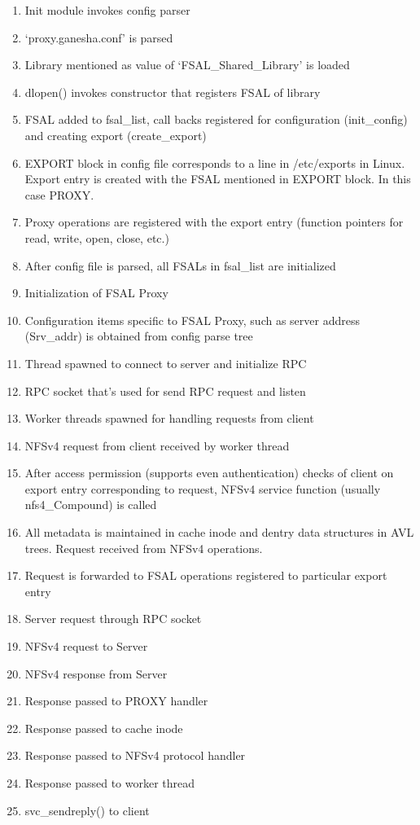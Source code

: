 \documentclass[10pt, journal, twocolumn, twoside]{IEEEtran}
\begin{document}
\begin{enumerate}
\item Init module invokes config parser %
\item `proxy.ganesha.conf' is parsed %
\item Library mentioned as value of `FSAL\_Shared\_Library' is loaded %
\item dlopen() invokes constructor that registers FSAL of library %
\item FSAL added to fsal\_list, call backs registered for configuration (init\_config) and creating export (create\_export) %
\item EXPORT block in config file corresponds to a line in /etc/exports in Linux. Export entry is created with the FSAL
mentioned in EXPORT block. In this case PROXY. %
\item Proxy operations are registered with the export entry (function pointers for read, write, open, close, etc.) %
\item After config file is parsed, all FSALs in fsal\_list are initialized %
\item Initialization of FSAL Proxy %
\item Configuration items specific to FSAL Proxy, such as server address (Srv\_addr) is obtained from config parse tree %
\item Thread spawned to connect to server and initialize RPC %
\item RPC socket that's used for send RPC request and listen %
\item Worker threads spawned for handling requests from client %
\item NFSv4 request from client received by worker thread %
\item After access permission (supports even authentication) checks of client on export entry corresponding to request, NFSv4 service function (usually nfs4\_Compound) is called %
\item All metadata is maintained in cache inode and dentry data structures in AVL trees. Request received from NFSv4 operations. %
\item Request is forwarded to FSAL operations registered to particular export entry %
\item Server request through RPC socket %
\item NFSv4 request to Server %
\item NFSv4 response from Server %
\item Response passed to PROXY handler %
\item Response passed to cache inode %
\item Response passed to NFSv4 protocol handler %
\item Response passed to worker thread %
\item svc\_sendreply() to client %
\end{enumerate}
\end{document}
